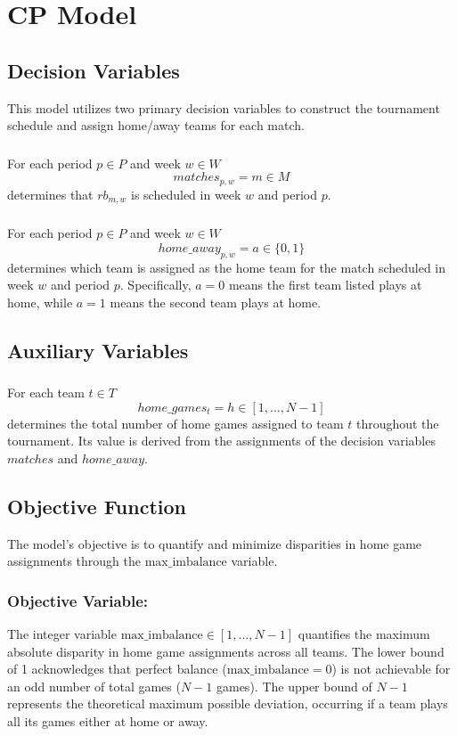 \section{CP Model}
\subsection{Decision Variables}
This model utilizes two primary decision variables to construct the tournament schedule and assign home/away teams for each match.

\subsubsection{}
For each period $p \in P$ and week $w \in W$
$$
matches_{p,w}=m \in M
$$
determines that $rb_{m, w}$ is scheduled in week $w$ and period $p$.


\subsubsection{}  
For each period $p \in P$ and week $w \in W$  
$$  
home\_away_{p,w} = a \in \{0, 1\}  
$$  
determines which team is assigned as the home team for the match scheduled in week $w$ and period $p$. Specifically, $a = 0$ means the first team listed plays at home, while $a = 1$ means the second team plays at home.


\subsection{Auxiliary Variables}
\subsubsection{}  
For each team $t \in T$  
$$  
home\_games_{t} = h \in [1, \dots, N-1]  
$$  
determines the total number of home games assigned to team $t$ throughout the tournament. Its value is derived from the assignments of the decision variables $matches$ and $home\_away$.


\subsection{Objective Function}

The model's objective is to quantify and minimize disparities in home game assignments through the $\text{max\_imbalance}$ variable.

\subsubsection{Objective Variable: }\label{objective}
The integer variable $\text{max\_imbalance} \in [1, \dots, N-1]$ quantifies the maximum absolute disparity in home game assignments across all teams. The lower bound of 1 acknowledges that perfect balance ($\text{max\_imbalance}=0$) is not achievable for an odd number of total games ($N-1$ games). The upper bound of $N-1$ represents the theoretical maximum possible deviation, occurring if a team plays all its games either at home or away.

